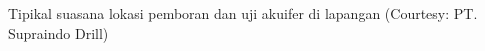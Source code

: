 \label{fig:drilling_location} Tipikal suasana lokasi pemboran dan uji akuifer di lapangan (Courtesy: PT. Supraindo Drill)